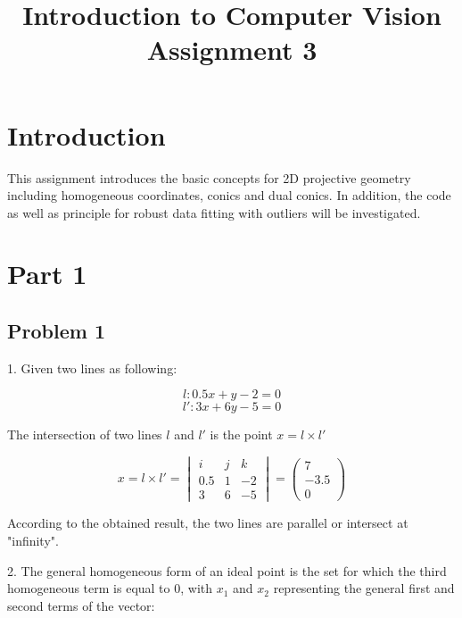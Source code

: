 \documentclass[conference]{IEEEtran}
\begin{document}
\title{Introduction to Computer Vision Assignment 3\\
}

\author{
}
\maketitle

\section{Introduction}

This assignment introduces the basic concepts for 2D projective geometry including homogeneous coordinates, conics and dual conics. In addition, the code as well as principle for robust data fitting with outliers will be investigated.

\section{Part 1}

\subsection{Problem 1}

1. Given two lines as following: 

\[ l: 0.5x + y - 2 = 0 \]
\[ l{'}: 3x + 6y - 5 = 0 \]

The intersection of two lines \(l\) and \(l{'}\) is the point \(x = l\times l{'}\)

\[ x = l\times l{'} = \begin{vmatrix}
i & j & k\\
0.5 & 1 & -2\\
3 & 6 & -5
\end{vmatrix} = \begin{pmatrix} 7\\-3.5\\0 \end{pmatrix} \]

According to the obtained result, the two lines are parallel or intersect at "infinity".

2. The general homogeneous form of an ideal point is the set for which the third homogeneous term is equal to \(0\), with \(x_1\) and \(x_2\) representing the general first and second terms of the vector:
\end{document}
